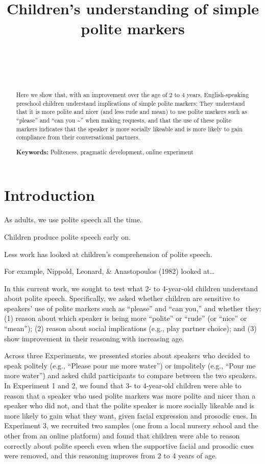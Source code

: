 \documentclass[10pt, letterpaper]{article}
\title{Children's understanding of simple polite markers}
\author{{\large \bf } \\ \texttt{} \\  \\}
\begin{document}
\maketitle

\begin{abstract}
Here we show that, with an improvement over the age of 2 to 4 years,
English-speaking preschool children understand implications of simple
polite markers: They understand that it is more polite and nicer (and
less rude and mean) to use polite markers such as ``please'' and ``can
you \textasciitilde{}'' when making requests, and that the use of these
polite markers indicates that the speaker is more socially likeable and
is more likely to gain compliance from their conversational partners.

\textbf{Keywords:}
Politeness, pragmatic development, online experiment
\end{abstract}

\section{Introduction}\label{introduction}

As adults, we use polite speech all the time.

Children produce polite speech early on.

Less work has looked at children's comprehension of polite speech.

For example, Nippold, Leonard, \& Anastopoulos (1982) looked at\ldots{}

In this current work, we sought to test what 2- to 4-year-old children
understand about polite speech. Specifically, we asked whether children
are sensitive to speakers' use of polite markers such as ``please'' and
``can you,'' and whether they: (1) reason about which speaker is being
more ``polite'' or ``rude'' (or ``nice'' or ``mean''); (2) reason about
social implications (e.g., play partner choice); and (3) show
improvement in their reasoning with increasing age.

Across three Experiments, we presented stories about speakers who
decided to speak politely (e.g., ``Please pour me more water'') or
impolitely (e.g., ``Pour me more water'') and asked child participants
to compare between the two speakers. In Experiment 1 and 2, we found
that 3- to 4-year-old children were able to reason that a speaker who
used polite markers was more polite and nicer than a speaker who did
not, and that the polite speaker is more socially likeable and is more
likely to gain what they want, given facial expression and prosodic
cues. In Experiment 3, we recruited two samples (one from a local
nursery school and the other from an online platform) and found that
children were able to reason correctly about polite speech even when the
supportive facial and prosodic cues were removed, and this reasoning
improves from 2 to 4 years of age.
\end{document}
